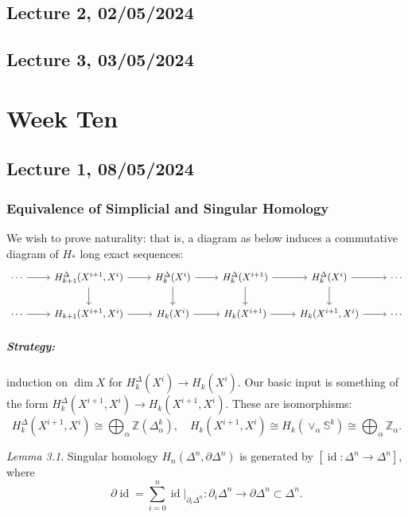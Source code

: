\documentclass[a4paper]{report}
\theoremstyle{definition}
\theoremstyle{remark}
\theoremstyle{proposition}
\theoremstyle{conjecture}
\theoremstyle{lemma}
\newtheorem{lemma}{Lemma}
\theoremstyle{corollary}
\theoremstyle{exercise}
\newcommand{\on}{\operatorname}
\begin{document}
\section{Lecture 2, 02/05/2024}

\section{Lecture 3, 03/05/2024}

\chapter{Week Ten}

\section{Lecture 1, 08/05/2024}

\subsection{Equivalence of Simplicial and Singular Homology}

We wish to prove naturality: that is, a diagram as below induces a commutative diagram of $H_\ast$ 
long exact sequences:
$$\begin{tikzcd}
    \cdots \arrow[r] & {H^\Delta_{k+1}(X^{i+1},X^i)} \arrow[r] \arrow[d] & H^\Delta_{k}(X^i) \arrow[r] \arrow[d] & H_k^\Delta(X^{i+1}) \arrow[r] \arrow[d] & H_k^\Delta(X^i) \arrow[d] \arrow[r] & \cdots \\
    \cdots \arrow[r] & {H_{k+1}(X^{i+1},X^i)} \arrow[r]                  & H_k(X^i) \arrow[r]                    & H_k(X^{i+1}) \arrow[r]                  & {H_k(X^{i+1},X^i)} \arrow[r]        & \cdots
\end{tikzcd}$$

\paragraph{Strategy:} induction on $\dim X$ for $H_k^\Delta(X^i) \to H_k(X^i)$. Our basic input is something of the form 
$H_k^\Delta(X^{i+1},X^i) \to H_k(X^{i+1},X^i)$. These are isomorphisms:
$$H_k^\Delta(X^{i+1},X^i) \cong \bigoplus_\alpha \mathbb{Z}(\Delta_\alpha^k), \quad H_k(X^{i+1},X^i) \cong H_k(\vee_\alpha \mathbb{S}^k) \cong \bigoplus_\alpha \mathbb{Z}_\alpha.$$

\begin{lemma}\label{lem111}
    Singular homology $H_n(\Delta^n, \partial\Delta^n)$ is generated by $[\on{id} : \Delta^n \to \Delta^n]$, where 
    $$\partial \on{id} = \sum_{i=0}^n \on{id}\vert_{\partial_i\Delta^n} : \partial_i\Delta^n \longrightarrow \partial\Delta^n \subset \Delta^n.$$
\end{lemma}
\end{document}
